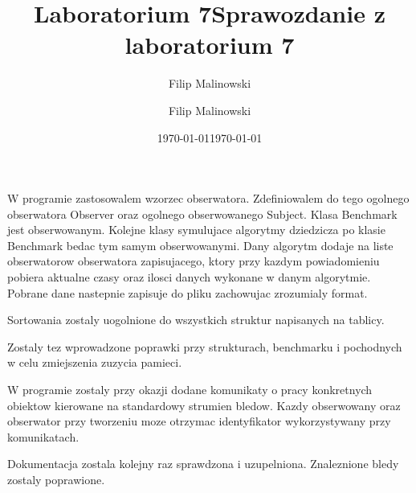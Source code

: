 \documentclass[a4paper,10pt]{scrartcl}
\title{Laboratorium 7}
\author{Filip Malinowski}
\date{\today}
\begin{document}
\title{Sprawozdanie z laboratorium 7}
\author{Filip Malinowski}
\date{\today}

\maketitle

W programie zastosowalem wzorzec obserwatora.
Zdefiniowalem do tego ogolnego obserwatora
Observer oraz ogolnego obserwowanego Subject.
Klasa Benchmark jest obserwowanym.
Kolejne klasy symulujace algorytmy dziedzicza
po klasie Benchmark bedac tym samym obserwowanymi.
Dany algorytm dodaje na liste
obserwatorow obserwatora zapisujacego,
ktory przy kazdym powiadomieniu pobiera
aktualne czasy oraz ilosci danych wykonane
w danym algorytmie. Pobrane dane nastepnie
zapisuje do pliku zachowujac zrozumialy format.

Sortowania zostaly uogolnione do wszystkich
struktur napisanych na tablicy.

Zostaly tez wprowadzone poprawki przy strukturach,
benchmarku i pochodnych w celu zmiejszenia
zuzycia pamieci.

W programie zostaly przy okazji dodane komunikaty
o pracy konkretnych obiektow kierowane na
standardowy strumien bledow.
Kazdy obserwowany oraz obserwator przy tworzeniu
moze otrzymac identyfikator wykorzystywany
przy komunikatach.

Dokumentacja zostala kolejny raz sprawdzona
i uzupelniona. Znaleznione bledy zostaly poprawione.
\end{document}
